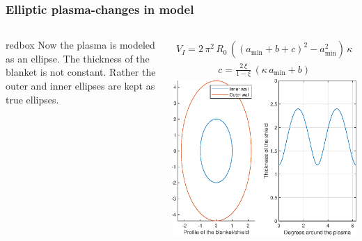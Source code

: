 \documentclass[hyperref={colorlinks=true,urlcolor=blue,linkcolor=.},aspectratio=1610,mathserif]{beamer}
\begin{document}
\begin{frame}
	\frametitle{Elliptic plasma-changes in model}
	\begin{columns}
		\begin{beamercolorbox}[sep=1em,wd=8cm]{redbox}
			Now the plasma is modeled as an ellipse.
			The thickness of the blanket is not constant. Rather the outer and inner ellipses are kept as true ellipses.
		\end{beamercolorbox}
		\begin{align}
			V_{\si{I}}=2\,\pi^{2}\, R_{0}\,((a_{\min}+b+c)^{2}-a_{\min}^{2})\,\kappa
		\end{align}
		\begin{align}
			c=\frac{2\,\xi}{1-\xi}\,(\kappa\, a_{\min}+b)
		\end{align}
		\centering
		\includegraphics[width=\textwidth]{MatlabFigures/ShieldThickness/ShieldThickness.eps}
	\end{columns}
\end{frame}
\end{document}
